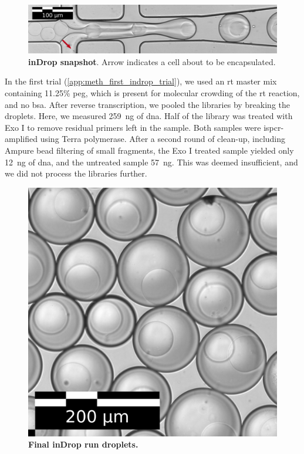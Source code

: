 \begin{figure}[ht]
\centerfloat
\includegraphics[width=\textwidth]{./ims/ind_snapshot.png}
\caption[inDrop snapshot]{\textbf{inDrop snapshot}. Arrow indicates a cell about to be encapsulated.}
\label{fig:ind_snapshot}
\end{figure}

In the first trial (\ref{app:meth_first_indrop_trial}), we used an \acrshort{rt} master mix containing 11.25\% \acrshort{peg}, which is present for molecular crowding of the \acrshort{rt} reaction, and no \acrshort{bsa}. After reverse transcription, we pooled the libraries by breaking the droplets. Here, we measured \SI{259}{\ng} of \acrshort{dna}. Half of the library was treated with Exo I to remove residual primers left in the sample. Both samples were \acrshort{ispcr}-amplified using Terra polymerase. After a second round of clean-up, including Ampure bead filtering of small fragments, the Exo I treated sample yielded only \SI{12}{\ng} of \acrshort{dna}, and the untreated sample \SI{57}{\ng}. This was deemed insufficient, and we did not process the libraries further.\pms

\begin{figure}
\centering
\includegraphics[width=\textwidth/3]{./ims/ind_suresh.png}
\caption[Final inDrop run droplets]{\textbf{Final inDrop run droplets.}}
\label{fig:ind_suresh}
\vspace{-20pt}
\end{figure}

